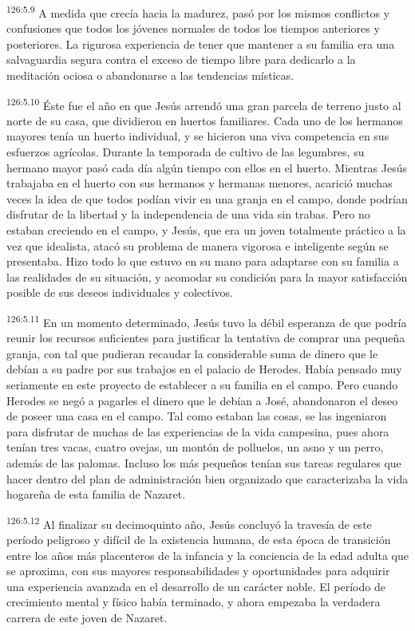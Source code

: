 \par 
\textsuperscript{126:5.9} A medida que crecía hacia la madurez, pasó por los mismos conflictos y confusiones que todos los jóvenes normales de todos los tiempos anteriores y posteriores. La rigurosa experiencia de tener que mantener a su familia era una salvaguardia segura contra el exceso de tiempo libre para dedicarlo a la meditación ociosa o abandonarse a las tendencias místicas.

\par 
\textsuperscript{126:5.10} Éste fue el año en que Jesús arrendó una gran parcela de terreno justo al norte de su casa, que dividieron en huertos familiares. Cada uno de los hermanos mayores tenía un huerto individual, y se hicieron una viva competencia en sus esfuerzos agrícolas. Durante la temporada de cultivo de las legumbres, su hermano mayor pasó cada día algún tiempo con ellos en el huerto. Mientras Jesús trabajaba en el huerto con sus hermanos y hermanas menores, acarició muchas veces la idea de que todos podían vivir en una granja en el campo, donde podrían disfrutar de la libertad y la independencia de una vida sin trabas. Pero no estaban creciendo en el campo, y Jesús, que era un joven totalmente práctico a la vez que idealista, atacó su problema de manera vigorosa e inteligente según se presentaba. Hizo todo lo que estuvo en su mano para adaptarse con su familia a las realidades de su situación, y acomodar su condición para la mayor satisfacción posible de sus deseos individuales y colectivos.

\par 
\textsuperscript{126:5.11} En un momento determinado, Jesús tuvo la débil esperanza de que podría reunir los recursos suficientes para justificar la tentativa de comprar una pequeña granja, con tal que pudieran recaudar la considerable suma de dinero que le debían a su padre por sus trabajos en el palacio de Herodes. Había pensado muy seriamente en este proyecto de establecer a su familia en el campo. Pero cuando Herodes se negó a pagarles el dinero que le debían a José, abandonaron el deseo de poseer una casa en el campo. Tal como estaban las cosas, se las ingeniaron para disfrutar de muchas de las experiencias de la vida campesina, pues ahora tenían tres vacas, cuatro ovejas, un montón de polluelos, un asno y un perro, además de las palomas. Incluso los más pequeños tenían sus tareas regulares que hacer dentro del plan de administración bien organizado que caracterizaba la vida hogareña de esta familia de Nazaret.

\par 
\textsuperscript{126:5.12} Al finalizar su decimoquinto año, Jesús concluyó la travesía de este período peligroso y difícil de la existencia humana, de esta época de transición entre los años más placenteros de la infancia y la conciencia de la edad adulta que se aproxima, con sus mayores responsabilidades y oportunidades para adquirir una experiencia avanzada en el desarrollo de un carácter noble. El período de crecimiento mental y físico había terminado, y ahora empezaba la verdadera carrera de este joven de Nazaret.